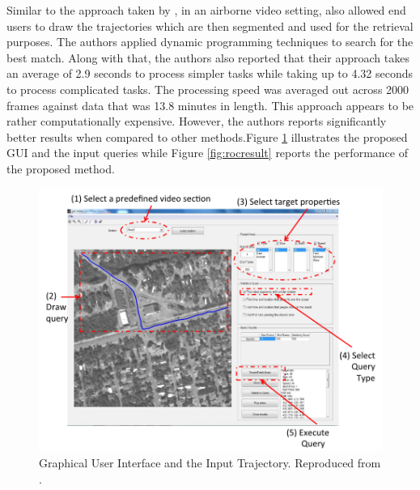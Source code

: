 Similar to the approach taken by \cite{lai2015video}, in an airborne video setting,  also allowed end users to draw the trajectories which are then segmented and used for the retrieval purposes. The authors applied dynamic programming techniques to search for the best match. Along with that, the authors also reported that their approach takes an average of 2.9 seconds to process simpler tasks while taking up to 4.32 seconds to process complicated tasks. The processing speed was averaged out across 2000 frames against data that was 13.8 minutes in length. This approach appears to be rather computationally expensive. However, the authors reports significantly better results when compared to other methods.Figure \ref{fig:drawquery2} illustrates the proposed GUI and the input queries while Figure \ref{fig:rocresult} reports the performance of the proposed method.


\begin{figure}[hbt!]\centering
\includegraphics[width=.6\textwidth]{image/lit/trajdraw2.PNG}
\caption[Graphical User Interface and the Input Trajectory.]
{Graphical User Interface and the Input Trajectory.
Reproduced from .}
\label{fig:drawquery2}
\end{figure}

